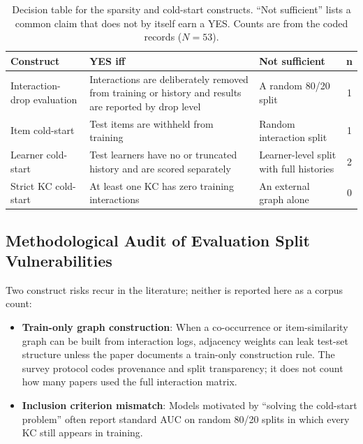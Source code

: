 \documentclass[lettersize,journal]{IEEEtran}
\begin{document}
\begin{table}[t]
\caption{Decision table for the sparsity and cold-start constructs. ``Not sufficient'' lists a common claim that does not by itself earn a YES. Counts are from the coded records ($N=53$).}
\label{tab:coldstart_decision}
\centering
\footnotesize
\setlength{\tabcolsep}{2.5pt}
\begin{tabular}{@{}>{\raggedright\arraybackslash}p{}>{\raggedright\arraybackslash}p{}>{\raggedright\arraybackslash}p{}c@{}}
\toprule
\textbf{Construct} & \textbf{YES iff} & \textbf{Not sufficient} & \textbf{n} \\
\midrule
Interaction-drop evaluation & Interactions are deliberately removed from training or history and results are reported by drop level & A random 80/20 split & 1 \\
Item cold-start & Test items are withheld from training & Random interaction split & 1 \\
Learner cold-start & Test learners have no or truncated history and are scored separately & Learner-level split with full histories & 2 \\
Strict KC cold-start & At least one KC has zero training interactions & An external graph alone & 0 \\
\bottomrule
\end{tabular}
\end{table}

\subsection{Methodological Audit of Evaluation Split Vulnerabilities}
Two construct risks recur in the literature; neither is reported here as a corpus count:
\begin{itemize}
    \item \textbf{Train-only graph construction}: When a co-occurrence or item-similarity graph can be built from interaction logs, adjacency weights can leak test-set structure unless the paper documents a train-only construction rule. The survey protocol codes provenance and split transparency; it does not count how many papers used the full interaction matrix.
    \item \textbf{Inclusion criterion mismatch}: Models motivated by ``solving the cold-start problem'' often report standard AUC on random 80/20 splits in which every KC still appears in training.
\end{itemize}
\end{document}

